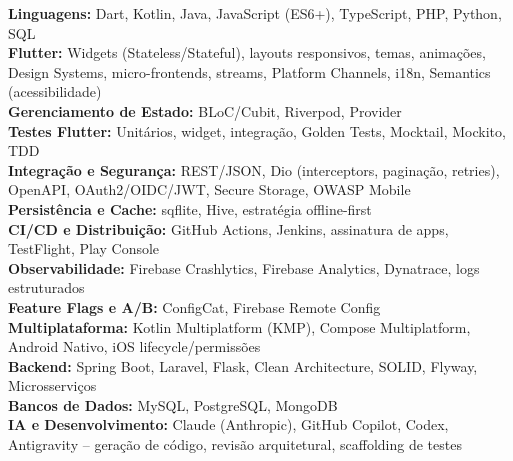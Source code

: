 \documentclass[letterpaper,11pt]{article}
\begin{document}
\begin{itemize}[leftmargin=0.15in, label={}]
\small{\item{
\vspace{1mm}
\textbf{Linguagens:} Dart, Kotlin, Java, JavaScript (ES6+), TypeScript, PHP, Python, SQL \\
\vspace{1mm}
\textbf{Flutter:} Widgets (Stateless/Stateful), layouts responsivos, temas, animações, Design Systems, micro-frontends, streams, Platform Channels, i18n, Semantics (acessibilidade) \\
\vspace{1mm}
\textbf{Gerenciamento de Estado:} BLoC/Cubit, Riverpod, Provider \\
\vspace{1mm}
\textbf{Testes Flutter:} Unitários, widget, integração, Golden Tests, Mocktail, Mockito, TDD \\
\vspace{1mm}
\textbf{Integração e Segurança:} REST/JSON, Dio (interceptors, paginação, retries), OpenAPI, OAuth2/OIDC/JWT, Secure Storage, OWASP Mobile \\
\vspace{1mm}
\textbf{Persistência e Cache:} sqflite, Hive, estratégia offline-first \\
\vspace{1mm}
\textbf{CI/CD e Distribuição:} GitHub Actions, Jenkins, assinatura de apps, TestFlight, Play Console \\
\vspace{1mm}
\textbf{Observabilidade:} Firebase Crashlytics, Firebase Analytics, Dynatrace, logs estruturados \\
\vspace{1mm}
\textbf{Feature Flags e A/B:} ConfigCat, Firebase Remote Config \\
\vspace{1mm}
\textbf{Multiplataforma:} Kotlin Multiplatform (KMP), Compose Multiplatform, Android Nativo, iOS lifecycle/permissões \\
\vspace{1mm}
\textbf{Backend:} Spring Boot, Laravel, Flask, Clean Architecture, SOLID, Flyway, Microsserviços \\
\vspace{1mm}
\textbf{Bancos de Dados:} MySQL, PostgreSQL, MongoDB \\
\vspace{1mm}
\textbf{IA e Desenvolvimento:} Claude (Anthropic), GitHub Copilot, Codex, Antigravity -- geração de código, revisão arquitetural, scaffolding de testes \\
}}
\end{itemize}
\end{document}
